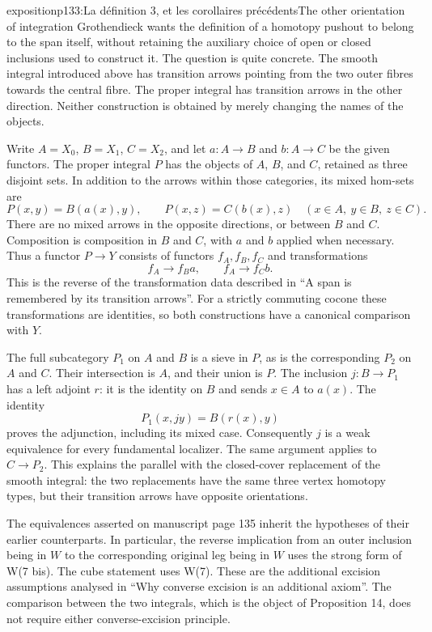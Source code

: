 \begin{dcomment}{exposition}{p133:La définition 3, et les corollaires précédents}{The other orientation of integration}
Grothendieck wants the definition of a homotopy pushout to belong to the span itself, without retaining the auxiliary choice of open or closed inclusions used to construct it. The question is quite concrete. The smooth integral introduced above has transition arrows pointing from the two outer fibres towards the central fibre. The proper integral has transition arrows in the other direction. Neither construction is obtained by merely changing the names of the objects.

Write $A=X_0$, $B=X_1$, $C=X_2$, and let $a:A\to B$ and $b:A\to C$ be the given functors. The proper integral $P$ has the objects of $A$, $B$, and $C$, retained as three disjoint sets. In addition to the arrows within those categories, its mixed hom-sets are
\[
 P(x,y)=B(a(x),y),\qquad
 P(x,z)=C(b(x),z)
 \quad(x\in A,\ y\in B,\ z\in C).
\]
There are no mixed arrows in the opposite directions, or between $B$ and $C$. Composition is composition in $B$ and $C$, with $a$ and $b$ applied when necessary. Thus a functor $P\to Y$ consists of functors $f_A,f_B,f_C$ and transformations
\[
 f_A\longrightarrow f_Ba,\qquad f_A\longrightarrow f_Cb.
\]
This is the reverse of the transformation data described in ``A span is remembered by its transition arrows''. For a strictly commuting cocone these transformations are identities, so both constructions have a canonical comparison with $Y$.

The full subcategory $P_1$ on $A$ and $B$ is a sieve in $P$, as is the corresponding $P_2$ on $A$ and $C$. Their intersection is $A$, and their union is $P$. The inclusion $j:B\to P_1$ has a left adjoint $r$: it is the identity on $B$ and sends $x\in A$ to $a(x)$. The identity
\[
 P_1(x,jy)=B(r(x),y)
\]
proves the adjunction, including its mixed case. Consequently $j$ is a weak equivalence for every fundamental localizer. The same argument applies to $C\to P_2$. This explains the parallel with the closed-cover replacement of the smooth integral: the two replacements have the same three vertex homotopy types, but their transition arrows have opposite orientations.

The equivalences asserted on manuscript page 135 inherit the hypotheses of their earlier counterparts. In particular, the reverse implication from an outer inclusion being in $W$ to the corresponding original leg being in $W$ uses the strong form of W(7 bis). The cube statement uses W(7). These are the additional excision assumptions analysed in ``Why converse excision is an additional axiom''. The comparison between the two integrals, which is the object of Proposition 14, does not require either converse-excision principle.
\end{dcomment}


